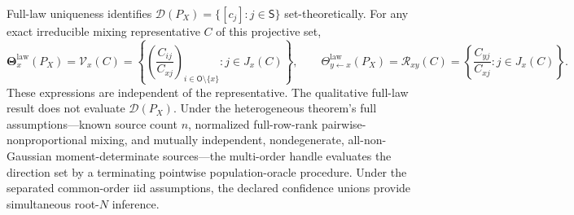 Full-law uniqueness identifies \(\mathcal D(P_X)=\{[c_j]:j\in\mathsf S\}\) set-theoretically. For any exact irreducible mixing representative \(C\) of this projective set,
\[
 \boldsymbol\Theta_x^{\mathrm{law}}(P_X)
 =\mathcal V_x(C)
 =\left\{\left(\frac{C_{ij}}{C_{xj}}\right)_{i\in\mathsf O\setminus\{x\}}:j\in J_x(C)\right\},
 \qquad
 \Theta_{y\leftarrow x}^{\mathrm{law}}(P_X)
 =\mathcal R_{xy}(C)
 =\left\{\frac{C_{yj}}{C_{xj}}:j\in J_x(C)\right\}.
\]
These expressions are independent of the representative. The qualitative full-law result does not evaluate \(\mathcal D(P_X)\). Under the heterogeneous theorem's full assumptions---known source count \(n\), normalized full-row-rank pairwise-nonproportional mixing, and mutually independent, nondegenerate, all-non-Gaussian moment-determinate sources---the multi-order handle evaluates the direction set by a terminating pointwise population-oracle procedure. Under the separated common-order iid assumptions, the declared confidence unions provide simultaneous root-\(N\) inference.